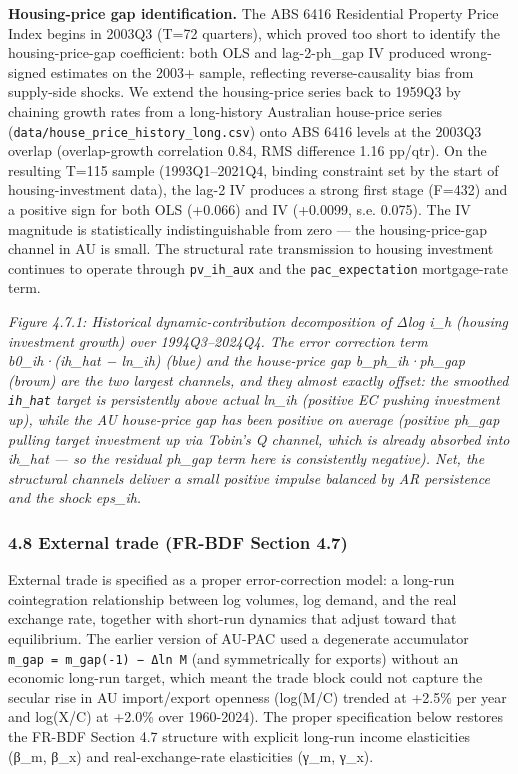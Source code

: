 \documentclass[
]{article}
\begin{document}
\textbf{Housing-price gap identification.} The ABS 6416 Residential
Property Price Index begins in 2003Q3 (T=72 quarters), which proved too
short to identify the housing-price-gap coefficient: both OLS and
lag-2-ph\_gap IV produced wrong-signed estimates on the 2003+ sample,
reflecting reverse-causality bias from supply-side shocks. We extend the
housing-price series back to 1959Q3 by chaining growth rates from a
long-history Australian house-price series
(\texttt{data/house\_price\_history\_long.csv}) onto ABS 6416 levels at
the 2003Q3 overlap (overlap-growth correlation 0.84, RMS difference 1.16
pp/qtr). On the resulting T=115 sample (1993Q1--2021Q4, binding
constraint set by the start of housing-investment data), the lag-2 IV
produces a strong first stage (F=432) and a positive sign for both OLS
(+0.066) and IV (+0.0099, s.e. 0.075). The IV magnitude is statistically
indistinguishable from zero --- the housing-price-gap channel in AU is
small. The structural rate transmission to housing investment continues
to operate through \texttt{pv\_ih\_aux} and the
\texttt{pac\_expectation} mortgage-rate term.

\emph{Figure 4.7.1: Historical dynamic-contribution decomposition of
Δlog i\_h (housing investment growth) over 1994Q3--2024Q4. The error
correction term b0\_ih·(ih\_hat − ln\_ih) (blue) and the house-price gap
b\_ph\_ih·ph\_gap (brown) are the two largest channels, and they almost
exactly offset: the smoothed \texttt{ih\_hat} target is persistently
above actual ln\_ih (positive EC pushing investment up), while the AU
house-price gap has been positive on average (positive ph\_gap pulling
target investment up via Tobin's Q channel, which is already absorbed
into ih\_hat --- so the residual ph\_gap term here is consistently
negative). Net, the structural channels deliver a small positive impulse
balanced by AR persistence and the shock eps\_ih.}

\subsubsection{4.8 External trade (FR-BDF Section
4.7)}\label{external-trade-fr-bdf-section-4.7}

External trade is specified as a proper error-correction model: a
long-run cointegration relationship between log volumes, log demand, and
the real exchange rate, together with short-run dynamics that adjust
toward that equilibrium. The earlier version of AU-PAC used a degenerate
accumulator \texttt{m\_gap\ =\ m\_gap(-1)\ −\ Δln\ M} (and symmetrically
for exports) without an economic long-run target, which meant the trade
block could not capture the secular rise in AU import/export openness
(log(M/C) trended at +2.5\% per year and log(X/C) at +2.0\% over
1960-2024). The proper specification below restores the FR-BDF Section
4.7 structure with explicit long-run income elasticities (β\_m, β\_x)
and real-exchange-rate elasticities (γ\_m, γ\_x).
\end{document}
